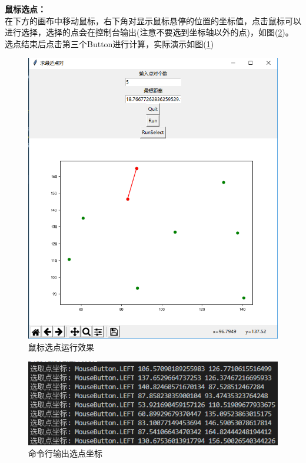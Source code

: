 \documentclass[UTF8]{ctexart}
\begin{document}
\textbf{鼠标选点：}\\
在下方的画布中移动鼠标，右下角对显示鼠标悬停的位置的坐标值，点击鼠标可以进行选择，选择的点会在控制台输出(注意不要选到坐标轴以外的点)，如图(\ref{img1-6})。选点结束后点击第三个Button进行计算，实际演示如图(\ref{img1-5})

\begin{figure}[H]
    \centering
    \includegraphics[width=1\textwidth]{img/1-5.png}
    \caption{鼠标选点运行效果}
    \label{img1-5}
\end{figure}

\begin{figure}[H]
    \centering
    \includegraphics[width=1\textwidth]{img/1-6.png}
    \caption{命令行输出选点坐标}
    \label{img1-6}
\end{figure}
\end{document}
